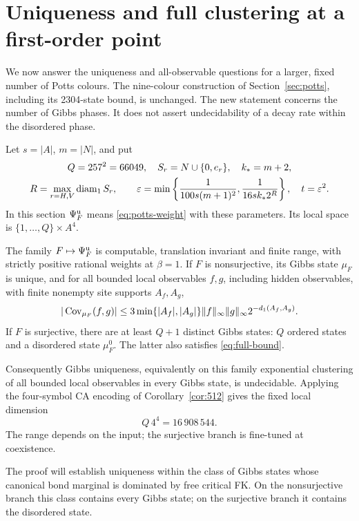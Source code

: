 \section{Uniqueness and full clustering at a first-order point}\label{sec:full}
We now answer the uniqueness and all-observable questions for a larger, fixed number of Potts colours. The nine-colour construction of Section~\ref{sec:potts}, including its 2304-state bound, is unchanged. The new statement concerns the number of Gibbs phases. It does not assert undecidability of a decay rate within the disordered phase.

Let $s=|A|$, $m=|N|$, and put
\begin{equation}\label{eq:full-parameters}
 \begin{gathered}
 Q=257^2=66049,\quad S_r=N\cup\{0,e_r\},\quad k_*=m+2,\\
 R=\max_{r=H,V}\operatorname{diam}_1 S_r,\qquad
 \varepsilon=\min\left\{\frac1{100s(m+1)^2},
                         \frac1{16s k_*2^R}\right\},\quad t=\varepsilon^2.
 \end{gathered}
\end{equation}
In this section $\Psi_F^{\rm u}$ means \eqref{eq:potts-weight} with these parameters. Its local space is $\{1,\ldots,Q\}\times A^4$.

\begin{theorem}\label{thm:full}
The family $F\mapsto\Psi_F^{\rm u}$ is computable, translation invariant and finite range, with strictly positive rational weights at $\beta=1$.
If $F$ is nonsurjective, its Gibbs state $\mu_F$ is unique, and for all bounded local observables $f,g$, including hidden observables, with finite nonempty site supports $A_f,A_g$,
\begin{equation}\label{eq:full-bound}
 |\operatorname{Cov}_{\mu_F}(f,g)|\le
 3\min\{|A_f|,|A_g|\}\|f\|_\infty\|g\|_\infty
 2^{-d_1(A_f,A_g)}.
\end{equation}
If $F$ is surjective, there are at least $Q+1$ distinct Gibbs states: $Q$ ordered states and a disordered state $\mu_F^0$. The latter also satisfies \eqref{eq:full-bound}.

Consequently Gibbs uniqueness, equivalently on this family exponential clustering of all bounded local observables in every Gibbs state, is undecidable. Applying the four-symbol CA encoding of Corollary~\ref{cor:512} gives the fixed local dimension
\[
 Q\,4^4=16\,908\,544.
\]
The range depends on the input; the surjective branch is fine-tuned at coexistence.
\end{theorem}
The proof will establish uniqueness within the class of Gibbs states whose canonical bond marginal is dominated by free critical FK. On the nonsurjective branch this class contains every Gibbs state; on the surjective branch it contains the disordered state.


